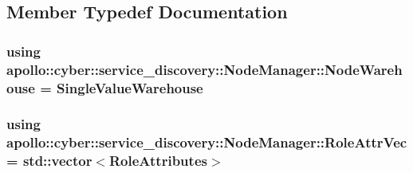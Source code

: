 \subsection{Member Typedef Documentation}
\hypertarget{classapollo_1_1cyber_1_1service__discovery_1_1NodeManager_a3482319db4df86634ca8459c794c3d0e}{
\subsubsection[{Node\-Warehouse}]{\setlength{\rightskip}{0pt plus 5cm}using {\bf apollo\-::cyber\-::service\-\_\-discovery\-::\-Node\-Manager\-::\-Node\-Warehouse} =  {\bf Single\-Value\-Warehouse}}}\label{classapollo_1_1cyber_1_1service__discovery_1_1NodeManager_a3482319db4df86634ca8459c794c3d0e}
\hypertarget{classapollo_1_1cyber_1_1service__discovery_1_1NodeManager_a796b7cfdc0e321399e31300f224d80e0}{
\subsubsection[{Role\-Attr\-Vec}]{\setlength{\rightskip}{0pt plus 5cm}using {\bf apollo\-::cyber\-::service\-\_\-discovery\-::\-Node\-Manager\-::\-Role\-Attr\-Vec} =  std\-::vector$<$Role\-Attributes$>$}}\label{classapollo_1_1cyber_1_1service__discovery_1_1NodeManager_a796b7cfdc0e321399e31300f224d80e0}


